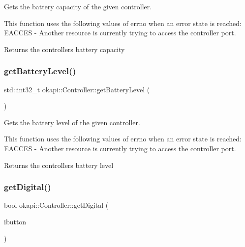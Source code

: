 Gets the battery capacity of the given controller.

This function uses the following values of errno when an error state is reached\+: E\+A\+C\+C\+ES -\/ Another resource is currently trying to access the controller port.

\begin{DoxyReturn}{Returns}
the controller\textquotesingle{}s battery capacity 
\end{DoxyReturn}
\mbox{\label{classokapi_1_1Controller_a3fec254e343a9c6381b3c8066b7bb145}} 
\subsubsection{\texorpdfstring{getBatteryLevel()}{getBatteryLevel()}}
{\footnotesize\ttfamily std\+::int32\+\_\+t okapi\+::\+Controller\+::get\+Battery\+Level (\begin{DoxyParamCaption}{ }\end{DoxyParamCaption})\hspace{0.3cm}{\ttfamily [virtual]}}

Gets the battery level of the given controller.

This function uses the following values of errno when an error state is reached\+: E\+A\+C\+C\+ES -\/ Another resource is currently trying to access the controller port.

\begin{DoxyReturn}{Returns}
the controller\textquotesingle{}s battery level 
\end{DoxyReturn}
\mbox{\label{classokapi_1_1Controller_ada8fab201fa8a46aa7b76487f1d7a546}} 
\subsubsection{\texorpdfstring{getDigital()}{getDigital()}}
{\footnotesize\ttfamily bool okapi\+::\+Controller\+::get\+Digital (\begin{DoxyParamCaption}\item[{\mbox{\hyperlink{namespaceokapi_af5040b3f1f33d27698871423e1453ab6}{Controller\+Digital}}}]{ibutton }\end{DoxyParamCaption})\hspace{0.3cm}{\ttfamily [virtual]}}

